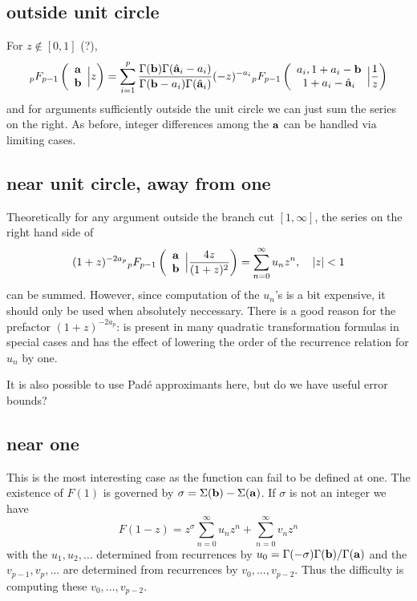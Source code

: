 \documentclass[10pt]{article}
\newcommand{\F}[5] {{}_{#1}F_{#2} \left( \begin{array}{c} #3 \\ #4 \end{array} \Big| #5  \right)}
\begin{document}
\subsection{outside unit circle}
For $z \not \in [0,1]$ (?),
\begin{equation*}
\F{p}{p-1}{\bold{a}}{\bold{b}}{z} = \sum_{i=1}^{p} \frac{\Gamma(\bold{b}) \Gamma(\hat{\bold{a}}_i-a_i)}{\Gamma(\bold{b}-a_i) \Gamma(\hat{\bold{a}}_i)} (-z)^{-a_i} \F{p}{p-1}{a_i,1+a_i-\bold{b}}{1+a_i-\hat{\bold{a}}_i}{\frac{1}{z}}
\end{equation*}
and for arguments sufficiently outside the unit circle we can just sum the series on the right. As before, integer differences among the $\bold{a}$ can be handled via limiting cases.

\subsection{near unit circle, away from one}
Theoretically for any argument outside the branch cut $[1,\infty]$, the series on the right hand side of
\begin{equation*}
(1+z)^{-2 a_p} \F{p}{p-1}{\bold{a}}{\bold{b}}{\frac{4 z}{(1+z)^2}} = \sum_{n=0}^{\infty}u_n z^n, \quad |z| < 1
\end{equation*}
can be summed. However, since computation of the $u_n$'s is a bit expensive, it should only be used when absolutely neccessary. There is a good reason for the prefactor $(1+z)^{-2a_p}$: is present in many quadratic transformation formulas in special cases and has the effect of lowering the order of the recurrence relation for $u_n$ by one.

It is also possible to use Pad\'e approximants here, but do we have useful error bounds?

\subsection{near one}

This is the most interesting case as the function can fail to be defined at one. The existence of $F(1)$ is governed by $\sigma = \Sigma(\bold{b}) - \Sigma(\bold{a})$. If $\sigma$ is not an integer we have
\begin{equation}
\label{nearone}
F(1-z) = z^{\sigma} \sum_{n=0}^{\infty} u_n z^n + \sum_{n=0}^{\infty} v_n z^n
\end{equation}
with the $u_1,u_2,\dots$ determined from recurrences by $u_0 = \Gamma(-\sigma)\Gamma(\bold{b})/\Gamma(\bold{a})$ and the $v_{p-1}, v_p, \dots$ are determined from recurrences by $v_0, \dots, v_{p-2}$. Thus the difficulty is computing these $v_0, \dots, v_{p-2}$.
\end{document}
